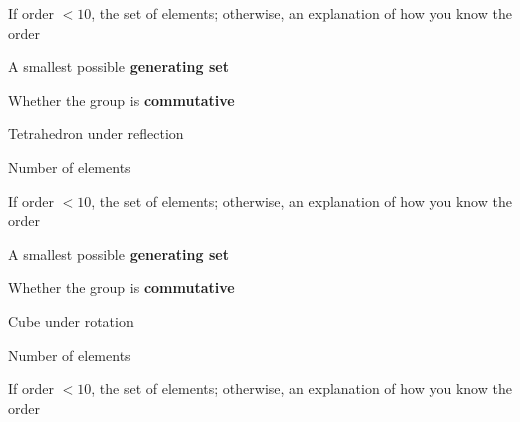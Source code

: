\documentclass[../gatm_answers.tex]{subfiles}
\begin{document}
\begin{inner_problem}
\item If order $< 10$, the set of elements; otherwise, an explanation of how you know the order
\end{inner_problem}

\begin{inner_problem}
\item A smallest possible \textbf{generating set}
\end{inner_problem}

\begin{inner_problem}
\item Whether the group is \textbf{commutative}
\end{inner_problem}

\begin{outer_problem}
\item Tetrahedron under reflection
\end{outer_problem}

\begin{inner_problem}[start=1]
\item Number of elements
\end{inner_problem}

\begin{inner_problem}
\item If order $< 10$, the set of elements; otherwise, an explanation of how you know the order
\end{inner_problem}

\begin{inner_problem}
\item A smallest possible \textbf{generating set}
\end{inner_problem}

\begin{inner_problem}
\item Whether the group is \textbf{commutative}
\end{inner_problem}

\begin{outer_problem}
\item Cube under rotation
\end{outer_problem}

\begin{inner_problem}[start=1]
\item Number of elements
\end{inner_problem}

\begin{inner_problem}
\item If order $< 10$, the set of elements; otherwise, an explanation of how you know the order
\end{inner_problem}
\end{document}

